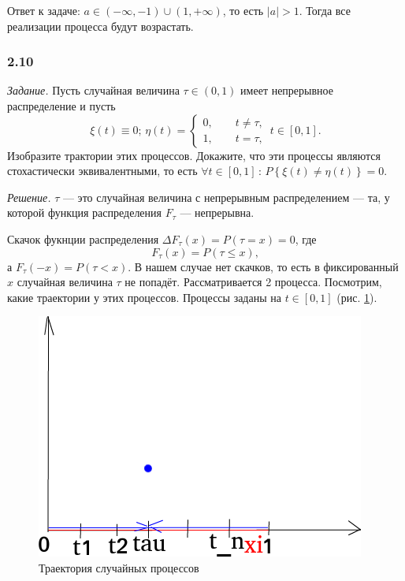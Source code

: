 Ответ к задаче: $a \in \left( - \infty, -1 \right) \cup \left( 1, + \infty \right) $,
то есть $ \left| a \right| > 1$.
Тогда все реализации процесса будут возрастать.

\subsubsection*{2.10}

\textit{Задание.}
Пусть случайная величина $ \tau \in \left( 0, 1 \right) $ имеет непрерывное распределение и пусть
$$ \xi \left( t \right) \equiv 0; \,
  \eta \left( t \right) =
  \begin{cases}
    0, \qquad t \neq \tau, \\
    1, \qquad t = \tau,
  \end{cases} \,
  t \in \left[ 0, 1 \right].$$
Изобразите трактории этих процессов.
Докажите, что эти процессы являются стохастически эквивалентными, то есть
$ \forall t \in \left[ 0, 1 \right] \, : \,
  P \left\{ \xi \left( t \right) \neq \eta \left( t \right) \right\} = 0$.

\textit{Решение.}
$ \tau $ --- это случайная величина с непрерывным распределением --- та,
у которой функция распределения $F_{ \tau }$ --- непрерывна.

Скачок фукнции распределения $ \Delta F_{ \tau } \left( x \right) = P \left( \tau = x \right) = 0$,
где
$$F_{ \tau } \left( x \right) = P \left( \tau \leq x \right),$$
а $F_{ \tau } \left( -x \right) = P \left( \tau < x \right) $.
В нашем случае нет скачков, то есть в фиксированный $x$ случайная величина $ \tau $ не попадёт.
Рассматривается 2 процесса.
Посмотрим, какие траектории у этих процессов.
Процессы заданы на $t \in \left[ 0, 1 \right] $ (рис. \ref{fig:210}).

\begin{figure}[h!]
 \centering
 \includegraphics[width=.5\textwidth]{./pictures/2_10.png}
 \caption{Траектория случайных процессов}
 \label{fig:210}
\end{figure}

